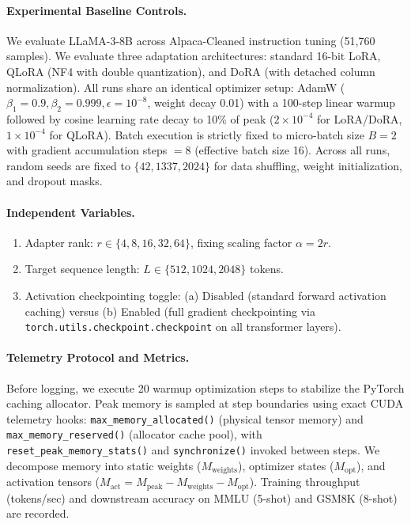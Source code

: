 \documentclass[11pt,a4paper]{article}
\begin{document}
\paragraph{Experimental Baseline Controls.} We evaluate LLaMA-3-8B across Alpaca-Cleaned instruction tuning (51,760 samples). We evaluate three adaptation architectures: standard 16-bit LoRA, QLoRA (NF4 with double quantization), and DoRA (with detached column normalization). All runs share an identical optimizer setup: AdamW ($\beta_1 = 0.9, \beta_2 = 0.999, \epsilon = 10^{-8}$, weight decay 0.01) with a 100-step linear warmup followed by cosine learning rate decay to 10\% of peak ($2\times 10^{-4}$ for LoRA/DoRA, $1\times 10^{-4}$ for QLoRA). Batch execution is strictly fixed to micro-batch size $B = 2$ with gradient accumulation steps $= 8$ (effective batch size 16). Across all runs, random seeds are fixed to $\{42, 1337, 2024\}$ for data shuffling, weight initialization, and dropout masks.

\paragraph{Independent Variables.}
\begin{enumerate}
\item Adapter rank: $r \in \{4, 8, 16, 32, 64\}$, fixing scaling factor $\alpha = 2r$.
\item Target sequence length: $L \in \{512, 1024, 2048\}$ tokens.
\item Activation checkpointing toggle: (a) Disabled (standard forward activation caching) versus (b) Enabled (full gradient checkpointing via \texttt{torch.utils.checkpoint.checkpoint} on all transformer layers).
\end{enumerate}

\paragraph{Telemetry Protocol and Metrics.}
Before logging, we execute 20 warmup optimization steps to stabilize the PyTorch caching allocator. Peak memory is sampled at step boundaries using exact CUDA telemetry hooks: \texttt{max\_memory\_allocated()} (physical tensor memory) and \texttt{max\_memory\_reserved()} (allocator cache pool), with \texttt{reset\_peak\_memory\_stats()} and \texttt{synchronize()} invoked between steps. We decompose memory into static weights ($M_{\text{weights}}$), optimizer states ($M_{\text{opt}}$), and activation tensors ($M_{\text{act}} = M_{\text{peak}} - M_{\text{weights}} - M_{\text{opt}}$). Training throughput (tokens/sec) and downstream accuracy on MMLU (5-shot) and GSM8K (8-shot) are recorded.
\end{document}
